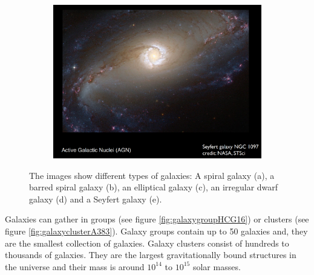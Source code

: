 \begin{figure}
\begin{subfigure}[b]{0.49\textwidth}
			\caption{}
			\label{fig:dwarfirregularNGC1427A}
		\end{subfigure}
		\begin{subfigure}[b]{0.55\textwidth}
			\includegraphics[width=1\linewidth]{img/ch-01/seyfertNGC1097.png}
			\caption{}
			\label{fig:seyfertNGC1097}
		\end{subfigure}
\caption{The images show different types of galaxies: A spiral galaxy (a), a barred spiral galaxy (b), an elliptical galaxy (c), an irregular dwarf galaxy (d) and a Seyfert galaxy (e).}
\end{figure}
Galaxies can gather in groups (see figure \ref{fig:galaxygroupHCG16}) or clusters (see figure \ref{fig:galaxyclusterA383}). Galaxy groups contain up to 50 galaxies and, they are the smallest collection of galaxies. Galaxy clusters consist of hundreds to thousands of galaxies. They are the largest gravitationally bound structures in the universe and their mass is around $10^{14}$ to $10^{15}$ solar masses.
